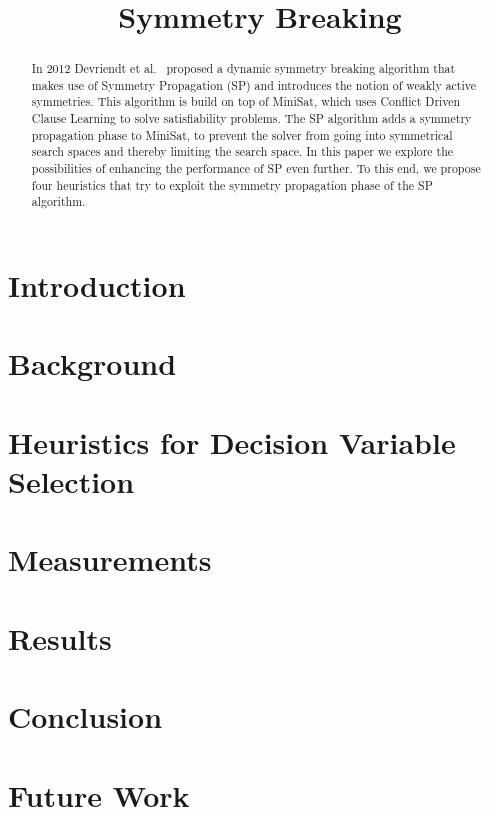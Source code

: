 

\title{Symmetry Breaking}


	\maketitle

	\begin{abstract}
	In 2012 Devriendt et al.~\cite{devriendt2012symmetry} proposed a dynamic symmetry breaking algorithm
	that makes use of Symmetry Propagation (SP) and introduces the notion of weakly active symmetries.
	This algorithm is build on top of MiniSat,
	which uses Conflict Driven Clause Learning to solve satisfiability problems. The SP algorithm adds a symmetry propagation phase to MiniSat,
	to prevent the solver from going into symmetrical search spaces and thereby limiting the search space.
	In this paper we explore the possibilities of enhancing the performance of SP even further. To this end, we propose four heuristics that try to exploit the symmetry propagation phase of the SP algorithm.
	\end{abstract}

	\section{Introduction}
		\label{sec:Introduction}
		

	\section{Background}
		\label{sec:Background}
		

	\section{Heuristics for Decision Variable Selection}
		\label{sec:DecisionVars}
		

	\section{Measurements}
		\label{sec:measurements}
		

	\section{Results}
		\label{sec:Results}
		

	\section{Conclusion}
		\label{sec:Conclusion}
		
	
	\section{Future Work}
		\label{sec:FutureWork}
		
	
	
	
	
	\clearpage
	
	


